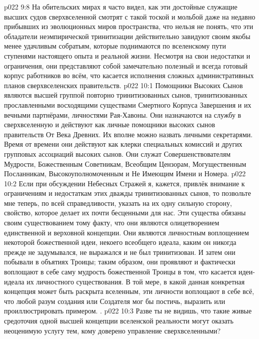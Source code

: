 \vs p022 9:8 На обительских мирах я часто видел, как эти достойные служащие высших судов сверхвселенной смотрят с такой тоской и мольбой даже на недавно прибывших из эволюционных миров пространства, что нельзя не понять, что эти обладатели неэмпирической тринитизации действительно завидуют своим якобы менее удачливым собратьям, которые поднимаются по вселенскому пути ступенями настоящего опыта и реальной жизни. Несмотря на свои недостатки и ограничения, они представляют собой замечательно полезный и всегда готовый корпус работников во всём, что касается исполнения сложных административных планов сверхвселенских правительств.
\vs p022 10:1 Помощники Высоких Сынов являются высшей группой повторно тринитизованных сынов, тринитизованных прославленными восходящими существами Смертного Корпуса Завершения и их вечными партнёрами, личностями Рая\hyp{}Хавоны. Они назначаются на службу в сверхвселенную и действуют как личные помощники высоких сынов правительств От Века Древних. Их вполне можно назвать личными секретарями. Время от времени они действуют как клерки специальных комиссий и других групповых ассоциаций высоких сынов. Они служат Совершенствователям Мудрости, Божественным Советникам, Всеобщим Цензорам, Могущественным Посланникам, Высокоуполномоченным и Не Имеющим Имени и Номера.
\vs p022 10:2 \pc Если при обсуждении Небесных Стражей я, кажется, привлёк внимание к ограничениям и недостаткам этих дважды тринитизованных сынов, то позвольте мне теперь, по всей справедливости, указать на их одну сильную сторону, свойство, которое делает их почти бесценными для нас. Эти существа обязаны своим существованием тому факту, что они являются олицетворением единственной и верховной концепции. Они являются личностным воплощением некоторой божественной идеи, некоего всеобщего идеала, каким он никогда прежде не задумывался, не выражался и не был тринитизован. И затем они побывали в объятиях Троицы; таким образом, они проявляют и фактически воплощают в себе саму мудрость божественной Троицы в том, что касается идеи\hyp{}идеала их личностного существования. В той мере, в какой данная конкретная концепция может быть раскрыта вселенным, эти личности воплощают в себе всё, что любой разум создания или Создателя мог бы постичь, выразить или проиллюстрировать примером. .
\vs p022 10:3 Разве ты не видишь, что такие живые средоточия одной высшей концепции вселенской реальности могут оказать неоценимую услугу тем, кому доверено управление сверхвселенными?
